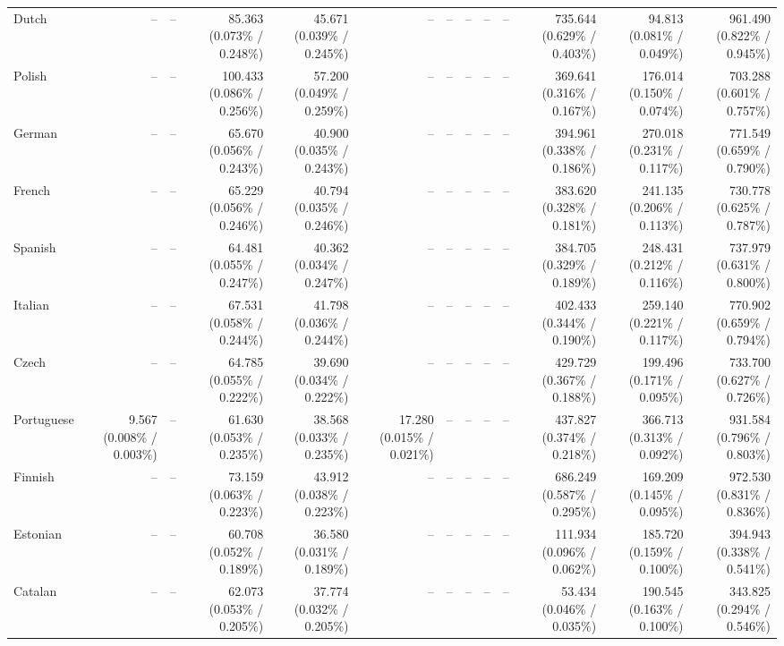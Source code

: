 \documentclass[10pt]{article}
\begin{document}
{\begin{tabular}{lrrrrrrrrrrrr}
Dutch & -- & -- & 85.363 (0.073\% / 0.248\%) & 45.671 (0.039\% / 0.245\%) & -- & -- & -- & -- & -- & 735.644 (0.629\% / 0.403\%) & 94.813 (0.081\% / 0.049\%) & 961.490 (0.822\% / 0.945\%) \\
Polish & -- & -- & 100.433 (0.086\% / 0.256\%) & 57.200 (0.049\% / 0.259\%) & -- & -- & -- & -- & -- & 369.641 (0.316\% / 0.167\%) & 176.014 (0.150\% / 0.074\%) & 703.288 (0.601\% / 0.757\%) \\
German & -- & -- & 65.670 (0.056\% / 0.243\%) & 40.900 (0.035\% / 0.243\%) & -- & -- & -- & -- & -- & 394.961 (0.338\% / 0.186\%) & 270.018 (0.231\% / 0.117\%) & 771.549 (0.659\% / 0.790\%) \\
French & -- & -- & 65.229 (0.056\% / 0.246\%) & 40.794 (0.035\% / 0.246\%) & -- & -- & -- & -- & -- & 383.620 (0.328\% / 0.181\%) & 241.135 (0.206\% / 0.113\%) & 730.778 (0.625\% / 0.787\%) \\
Spanish & -- & -- & 64.481 (0.055\% / 0.247\%) & 40.362 (0.034\% / 0.247\%) & -- & -- & -- & -- & -- & 384.705 (0.329\% / 0.189\%) & 248.431 (0.212\% / 0.116\%) & 737.979 (0.631\% / 0.800\%) \\
Italian & -- & -- & 67.531 (0.058\% / 0.244\%) & 41.798 (0.036\% / 0.244\%) & -- & -- & -- & -- & -- & 402.433 (0.344\% / 0.190\%) & 259.140 (0.221\% / 0.117\%) & 770.902 (0.659\% / 0.794\%) \\
Czech & -- & -- & 64.785 (0.055\% / 0.222\%) & 39.690 (0.034\% / 0.222\%) & -- & -- & -- & -- & -- & 429.729 (0.367\% / 0.188\%) & 199.496 (0.171\% / 0.095\%) & 733.700 (0.627\% / 0.726\%) \\
Portuguese & 9.567 (0.008\% / 0.003\%) & -- & 61.630 (0.053\% / 0.235\%) & 38.568 (0.033\% / 0.235\%) & 17.280 (0.015\% / 0.021\%) & -- & -- & -- & -- & 437.827 (0.374\% / 0.218\%) & 366.713 (0.313\% / 0.092\%) & 931.584 (0.796\% / 0.803\%) \\
Finnish & -- & -- & 73.159 (0.063\% / 0.223\%) & 43.912 (0.038\% / 0.223\%) & -- & -- & -- & -- & -- & 686.249 (0.587\% / 0.295\%) & 169.209 (0.145\% / 0.095\%) & 972.530 (0.831\% / 0.836\%) \\
Estonian & -- & -- & 60.708 (0.052\% / 0.189\%) & 36.580 (0.031\% / 0.189\%) & -- & -- & -- & -- & -- & 111.934 (0.096\% / 0.062\%) & 185.720 (0.159\% / 0.100\%) & 394.943 (0.338\% / 0.541\%) \\
Catalan & -- & -- & 62.073 (0.053\% / 0.205\%) & 37.774 (0.032\% / 0.205\%) & -- & -- & -- & -- & -- & 53.434 (0.046\% / 0.035\%) & 190.545 (0.163\% / 0.100\%) & 343.825 (0.294\% / 0.546\%) \\

\end{tabular}}
\end{document}
